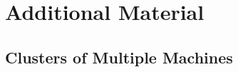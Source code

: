 %
%
%
%

\newpage
\section*{Additional Material}

\begin{comment} %
\subsection*{Installation and Initialization}

If you have not already installed \li{ipyparallel}, you may do so using the conda package manager.

\begin{lstlisting}[style=ShellInput]
$ conda update conda
$ conda update anaconda
$ conda install ipyparallel
\end{lstlisting}
\end{comment}

\subsection*{Clusters of Multiple Machines}

